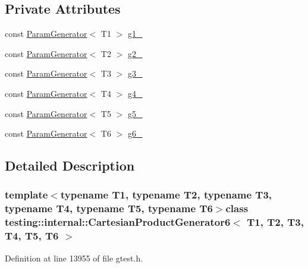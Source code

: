 \subsection*{\-Private \-Attributes}
\begin{DoxyCompactItemize}
\item 
const \hyperlink{classtesting_1_1internal_1_1ParamGenerator}{\-Param\-Generator}$<$ \-T1 $>$ \hyperlink{classtesting_1_1internal_1_1CartesianProductGenerator6_a315f81360fc67b016cbf514cb78c1975}{g1\-\_\-}
\item 
const \hyperlink{classtesting_1_1internal_1_1ParamGenerator}{\-Param\-Generator}$<$ \-T2 $>$ \hyperlink{classtesting_1_1internal_1_1CartesianProductGenerator6_a4bd40d1fbb8c6d2895b5201e62afbe38}{g2\-\_\-}
\item 
const \hyperlink{classtesting_1_1internal_1_1ParamGenerator}{\-Param\-Generator}$<$ \-T3 $>$ \hyperlink{classtesting_1_1internal_1_1CartesianProductGenerator6_acda98d4bf8f619856fb2e0ec015b9bc8}{g3\-\_\-}
\item 
const \hyperlink{classtesting_1_1internal_1_1ParamGenerator}{\-Param\-Generator}$<$ \-T4 $>$ \hyperlink{classtesting_1_1internal_1_1CartesianProductGenerator6_a1b3cef374aa9be9fbd4ed12caa7db9b5}{g4\-\_\-}
\item 
const \hyperlink{classtesting_1_1internal_1_1ParamGenerator}{\-Param\-Generator}$<$ \-T5 $>$ \hyperlink{classtesting_1_1internal_1_1CartesianProductGenerator6_a938d8dc16afe9878a43d89ce3cd87ad7}{g5\-\_\-}
\item 
const \hyperlink{classtesting_1_1internal_1_1ParamGenerator}{\-Param\-Generator}$<$ \-T6 $>$ \hyperlink{classtesting_1_1internal_1_1CartesianProductGenerator6_a905585e5d7722194673d92d7a29a2996}{g6\-\_\-}
\end{DoxyCompactItemize}


\subsection{\-Detailed \-Description}
\subsubsection*{template$<$typename T1, typename T2, typename T3, typename T4, typename T5, typename T6$>$class testing\-::internal\-::\-Cartesian\-Product\-Generator6$<$ T1, T2, T3, T4, T5, T6 $>$}



\-Definition at line 13955 of file gtest.\-h.



